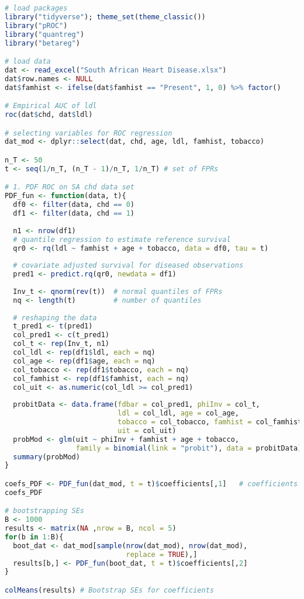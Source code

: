 \documentclass{article}
\begin{document}
\begin{lstlisting}[language=R]
# load packages
library("tidyverse"); theme_set(theme_classic())
library("pROC")
library("quantreg")
library("betareg")

# load data
dat <- read_excel("South African Heart Disease.xlsx")
dat$row.names <- NULL
dat$famhist <- ifelse(dat$famhist == "Present", 1, 0) %>% factor()

# Empirical AUC of ldl
roc(dat$chd, dat$ldl)

# selecting variables for ROC regression
dat_mod <- dplyr::select(dat, chd, age, ldl, famhist, tobacco)

n_T <- 50
t <- seq(1/n_T, (n_T - 1)/n_T, 1/n_T) # set of FPRs

# 1. PDF ROC on SA chd data set
PDF_fun <- function(data, t){
  df0 <- filter(data, chd == 0)
  df1 <- filter(data, chd == 1)
  
  n1 <- nrow(df1)
  # quantile regression to estimate reference survival
  qr0 <- rq(ldl ~ famhist + age + tobacco, data = df0, tau = t)
  
  # covariate adjusted survival for diseased observations
  pred1 <- predict.rq(qr0, newdata = df1)
  
  Inv_t <- qnorm(rev(t))  # normal quantiles of FPRs
  nq <- length(t)         # number of quantiles
  
  # reshaping the data
  t_pred1 <- t(pred1)
  col_pred1 <- c(t_pred1)
  col_t <- rep(Inv_t, n1)
  col_ldl <- rep(df1$ldl, each = nq)
  col_age <- rep(df1$age, each = nq)
  col_tobacco <- rep(df1$tobacco, each = nq)
  col_famhist <- rep(df1$famhist, each = nq)
  col_uit <- as.numeric(col_ldl >= col_pred1)
  
  probitData <- data.frame(fdbar = col_pred1, phiInv = col_t,
                           ldl = col_ldl, age = col_age,
                           tobacco = col_tobacco, famhist = col_famhist,
                           uit = col_uit)
  probMod <- glm(uit ~ phiInv + famhist + age + tobacco, 
                 family = binomial(link = "probit"), data = probitData)
  summary(probMod)
}

coefs_PDF <- PDF_fun(dat_mod, t = t)$coefficients[,1]   # coefficients
coefs_PDF

# bootstrapping SEs
B <- 1000
results <- matrix(NA ,nrow = B, ncol = 5)
for(b in 1:B){
  boot_dat <- dat_mod[sample(nrow(dat_mod), nrow(dat_mod),
                             replace = TRUE),]
  results[b,] <- PDF_fun(boot_dat, t = t)$coefficients[,2]
}

colMeans(results) # Bootstrap SEs for coefficients


\end{lstlisting}
\end{document}
